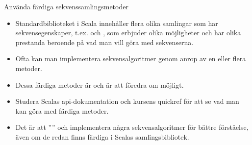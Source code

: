 \begin{Slide}{Använda färdiga sekvenssamlingsmetoder}
\begin{itemize}
\item Standardbiblioteket i Scala innehåller flera olika samlingar som har sekvensegenskaper, t.ex.  och , som erbjuder olika möjligheter och har olika prestanda beroende på vad man vill göra med sekvenserna.

\item Ofta kan man implementera sekvensalgoritmer genom anrop av en eller flera  metoder.

\item Dessa färdiga metoder är  och är att föredra om möjligt.

\item Studera Scalas api-dokumentation och kursens quickref för att se vad man kan göra med färdiga metoder.

\item Det är  att '''' och implementera några sekvensalgoritmer  för bättre förståelse, även om de redan finns färdiga i Scalas samlingsbibliotek.

\end{itemize}
\end{Slide}



